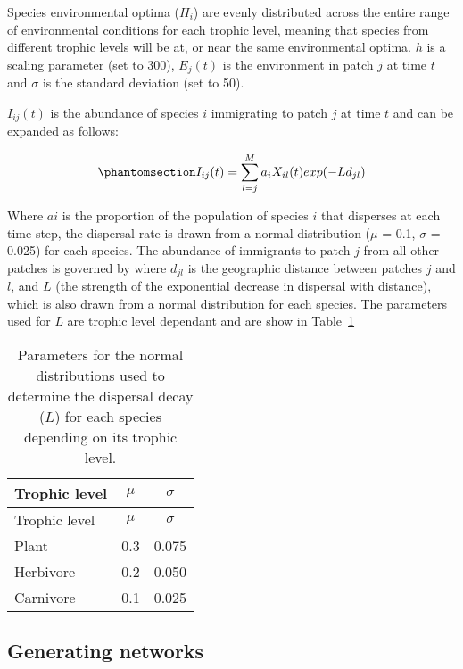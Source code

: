 \documentclass[
]{agujournal2019}
\begin{document}
Species environmental optima (\(H_i\)) are evenly distributed across the
entire range of environmental conditions for each trophic level, meaning
that species from different trophic levels will be at, or near the same
environmental optima. \(h\) is a scaling parameter (set to 300),
\(E_j(t)\) is the environment in patch \(j\) at time \(t\) and
\(\sigma\) is the standard deviation (set to 50).

\(I_{ij}(t)\) is the abundance of species \(i\) immigrating to patch
\(j\) at time \(t\) and can be expanded as follows:

\begin{equation}\phantomsection\label{eq-metacomm_imm}{
I_{ij}(t)=\sum_{l=j}^{M}a_iX_{il}(t)exp(-Ld_{jl})
}\end{equation}

Where \(ai\) is the proportion of the population of species \(i\) that
disperses at each time step, the dispersal rate is drawn from a normal
distribution (\(\mu\) = 0.1, \(\sigma\) = 0.025) for each species. The
abundance of immigrants to patch \(j\) from all other patches is
governed by where \(d_{jl}\) is the geographic distance between patches
\(j\) and \(l\), and \(L\) (the strength of the exponential decrease in
dispersal with distance), which is also drawn from a normal distribution
for each species. The parameters used for \(L\) are trophic level
dependant and are show in Table~\ref{tbl-interaction_decay}

\begin{longtable}[]{@{}lcc@{}}
\caption{Parameters for the normal distributions used to determine the
dispersal decay (\(L\)) for each species depending on its trophic
level.}\label{tbl-interaction_decay}\tabularnewline
\toprule\noalign{}
Trophic level & \(\mu\) & \(\sigma\) \\
\midrule\noalign{}
\endfirsthead
\toprule\noalign{}
Trophic level & \(\mu\) & \(\sigma\) \\
\midrule\noalign{}
\endhead
\bottomrule\noalign{}
\endlastfoot
Plant & 0.3 & 0.075 \\
Herbivore & 0.2 & 0.050 \\
Carnivore & 0.1 & 0.025 \\
\end{longtable}

\subsection{Generating networks}\label{generating-networks}
\end{document}
